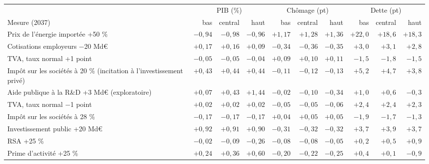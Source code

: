 \begin{tabular}{p{4.6cm}rrr|rrr|rrr}\toprule & \multicolumn{3}{c|}{PIB (\%)} & \multicolumn{3}{c|}{Chômage (pt)} & \multicolumn{3}{c}{Dette (pt)}\\ Mesure (2037) & bas & central & haut & bas & central & haut & bas & central & haut\\ \midrule
Prix de l'énergie importée +50 \% & $-0{,}94$ & $-0{,}98$ & $-0{,}96$ & $+1{,}17$ & $+1{,}28$ & $+1{,}36$ & $+22{,}0$ & $+18{,}6$ & $+18{,}3$\\
Cotisations employeurs −20 Md€ & $+0{,}17$ & $+0{,}16$ & $+0{,}09$ & $-0{,}34$ & $-0{,}36$ & $-0{,}35$ & $+3{,}0$ & $+3{,}1$ & $+2{,}8$\\
TVA, taux normal +1 point & $-0{,}05$ & $-0{,}05$ & $-0{,}04$ & $+0{,}09$ & $+0{,}10$ & $+0{,}11$ & $-1{,}5$ & $-1{,}8$ & $-1{,}5$\\
Impôt sur les sociétés à 20 \% (incitation à l'investissement privé) & $+0{,}43$ & $+0{,}44$ & $+0{,}44$ & $-0{,}11$ & $-0{,}12$ & $-0{,}13$ & $+5{,}2$ & $+4{,}7$ & $+3{,}8$\\
Aide publique à la R\&D +3 Md€ (exploratoire) & $+0{,}07$ & $+0{,}43$ & $+1{,}44$ & $-0{,}02$ & $-0{,}10$ & $-0{,}34$ & $+1{,}0$ & $+0{,}6$ & $-0{,}3$\\
TVA, taux normal −1 point & $+0{,}02$ & $+0{,}02$ & $+0{,}02$ & $-0{,}05$ & $-0{,}05$ & $-0{,}06$ & $+2{,}4$ & $+2{,}4$ & $+2{,}3$\\
Impôt sur les sociétés à 28 \% & $-0{,}17$ & $-0{,}17$ & $-0{,}17$ & $+0{,}04$ & $+0{,}05$ & $+0{,}05$ & $-1{,}9$ & $-1{,}7$ & $-1{,}3$\\
Investissement public +20 Md€ & $+0{,}92$ & $+0{,}91$ & $+0{,}90$ & $-0{,}31$ & $-0{,}32$ & $-0{,}32$ & $+3{,}7$ & $+3{,}9$ & $+3{,}7$\\
RSA +25 \% & $-0{,}02$ & $-0{,}09$ & $-0{,}26$ & $-0{,}08$ & $-0{,}08$ & $-0{,}05$ & $+0{,}2$ & $+0{,}5$ & $+0{,}9$\\
Prime d'activité +25 \% & $+0{,}24$ & $+0{,}36$ & $+0{,}60$ & $-0{,}20$ & $-0{,}22$ & $-0{,}25$ & $+0{,}4$ & $+0{,}1$ & $-0{,}9$\\\bottomrule\end{tabular}